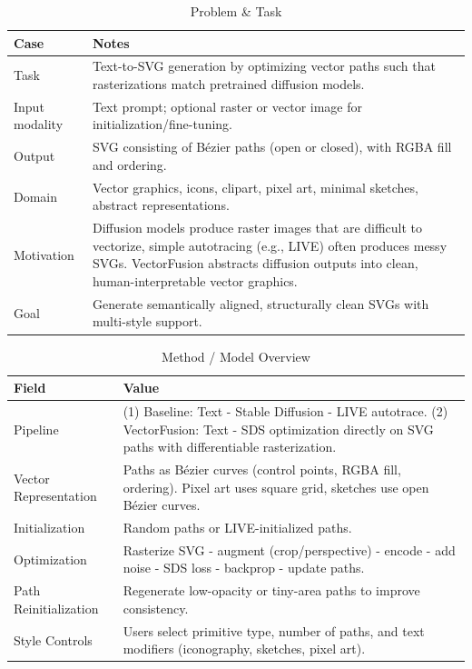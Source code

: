 \begin{table}[h!]
\centering
\caption{Problem \& Task}
\begin{tabular}{|l|p{10cm}|}
\hline
\textbf{Case} & \textbf{Notes} \\ \hline
Task & Text-to-SVG generation by optimizing vector paths such that rasterizations match pretrained diffusion models. \\ \hline
Input modality & Text prompt; optional raster or vector image for initialization/fine-tuning. \\ \hline
Output & SVG consisting of Bézier paths (open or closed), with RGBA fill and ordering. \\ \hline
Domain & Vector graphics, icons, clipart, pixel art, minimal sketches, abstract representations. \\ \hline
Motivation & Diffusion models produce raster images that are difficult to vectorize, simple autotracing (e.g., LIVE) often produces messy SVGs. VectorFusion abstracts diffusion outputs into clean, human-interpretable vector graphics. \\ \hline
Goal & Generate semantically aligned, structurally clean SVGs with multi-style support. \\ \hline
\end{tabular}
\end{table}

\begin{table}[h!]
\centering
\caption{Method / Model Overview}
\begin{tabular}{|l|p{10cm}|}
\hline
\textbf{Field} & \textbf{Value} \\ \hline
Pipeline & (1) Baseline: Text - Stable Diffusion - LIVE autotrace. (2) VectorFusion: Text - SDS optimization directly on SVG paths with differentiable rasterization. \\ \hline
Vector Representation & Paths as Bézier curves (control points, RGBA fill, ordering). Pixel art uses square grid, sketches use open Bézier curves. \\ \hline
Initialization & Random paths or LIVE-initialized paths. \\ \hline
Optimization & Rasterize SVG - augment (crop/perspective) - encode - add noise - SDS loss - backprop - update paths. \\ \hline
Path Reinitialization &  Regenerate low-opacity or tiny-area paths to improve consistency. \\ \hline
Style Controls & Users select primitive type, number of paths, and text modifiers (iconography, sketches, pixel art). \\ \hline
\end{tabular}
\end{table}

